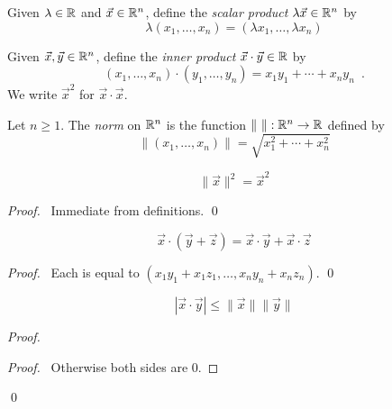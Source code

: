 \begin{definition}
    Given $\lambda \in \mathbb{R}$ and $\vec{x} \in \mathbb{R}^n$, define the \emph{scalar product} $\lambda \vec{x} \in \mathbb{R}^n$ by
    \[ \lambda (x_1, \ldots, x_n) = (\lambda x_1, \ldots, \lambda x_n) \]
\end{definition}

\begin{definition}
    Given $\vec{x}, \vec{y} \in \mathbb{R}^n$, define the \emph{inner product} $\vec{x} \cdot \vec{y} \in \mathbb{R}$ by
    \[ (x_1, \ldots, x_n) \cdot (y_1, \ldots, y_n) = x_1 y_1 + \cdots + x_n y_n \enspace . \]
    We write $\vec{x}^2$ for $\vec{x} \cdot \vec{x}$.
\end{definition}

\begin{definition}[Norm]
    Let $n \geq 1$. The \emph{norm} on $\mathbb{R}^n$ is the function $\| \ \| : \mathbb{R}^n \rightarrow \mathbb{R}$ defined by
    \[ \| (x_1, \ldots, x_n) \| = \sqrt{x_1^2 + \cdots + x_n^2} \]
\end{definition}

\begin{lemma}
    \[ \| \vec{x} \|^2 = \vec{x}^2 \]
\end{lemma}

\begin{proof}
    \pf\ Immediate from definitions. \qed
\end{proof}

\begin{lemma}
    \[ \vec{x} \cdot (\vec{y} + \vec{z}) = \vec{x} \cdot \vec{y} + \vec{x} \cdot \vec{z} \]
\end{lemma}

\begin{proof}
    \pf\ Each is equal to $(x_1 y_1 + x_1 z_1, \ldots, x_n y_n + x_n z_n)$. \qed
\end{proof}

\begin{lemma}
    \label{lemma:Cauchy-Schwarz}
    \[ |\vec{x} \cdot \vec{y}| \leq \| \vec{x} \| \| \vec{y} \| \]
\end{lemma}

\begin{proof}
    \pf
    \begin{proof}
        \pf\ Otherwise both sides are 0.
    \end{proof}
    \qed
\end{proof}

